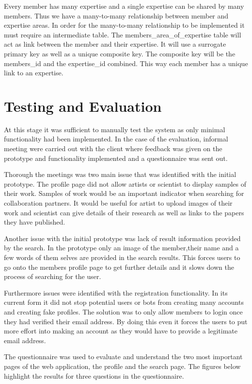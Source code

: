 \documentclass[a4paper,oneside,11pt]{report}
\begin{document}
Every member has many expertise and a single expertise can be shared by many members. Thus we have a many-to-many relationship between member and expertise areas. In order for the many-to-many relationship to be implemented it must require an intermediate table. The members\_area\_of\_expertise table will act as link between the member and their expertise. It will use a surrogate primary key as well as a unique composite key. The composite key will be the members\_id and the expertise\_id combined. This way each member has a unique link to an expertise.
\section{Testing and Evaluation}
At this stage it was sufficient to manually test the system as only minimal functionality had been implemented. In the case of the evaluation, informal meeting were carried out with the client where feedback was given on the prototype and functionality implemented and a questionnaire was sent out.

Thorough the meetings was two main issue that was identified with the initial prototype. The profile page did not allow artists or scientist to display samples of their work. Samples of work would be an important indicator when searching for collaboration partners. It would be useful for artist to upload images of their work and scientist can give details of their research as well as links to the papers they have published.

Another issue with the initial prototype was lack of result information provided by the search. In the prototype only an image of the member,their name and a few words of them selves are provided in the search results. This forces users to go onto the members profile page to get further details and it slows down the process of searching for the user.

Furthermore issues were identified with the registration functionality. In its current form it did not stop potential users or bots from creating many accounts and creating fake profiles. The solution was to only allow members to login once they had verified their email address. By doing this even it forces the users to put more effort into making an account as they would have to provide a legitimate email address.

The questionnaire was used to evaluate and understand the two most important pages of the web application, the profile and the search page. The figures below highlight the results for three questions in the questionnaire.
\end{document}
